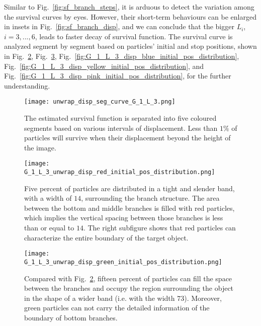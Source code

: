       Similar to Fig.~\ref{fig:sf_branch_steps}, it is arduous to
      detect the variation among the survival curves by eyes. However,
      their short-term behaviours can be enlarged in insets in
      Fig.~\ref{fig:sf_branch_disp}, and we can conclude that the
      bigger $L_i$, $i=3, ..., 6$, leads to faster decay of survival
      function. The survival curve is analyzed segment by segment
      based on particles' initial and stop positions, shown in
      Fig.~\ref{fig:G_1_L_3_disp_red_initial_pos_distribution},
      Fig.~\ref{fig:G_1_L_3_disp_green_initial_pos_distribution},
      Fig.~\ref{fig:G_1_L_3_disp_blue_initial_pos_distribution},
      Fig.~\ref{fig:G_1_L_3_disp_yellow_initial_pos_distribution}, and
      Fig.~\ref{fig:G_1_L_3_disp_pink_initial_pos_distribution}, for
      the further understanding.
      


      \begin{figure}
         \centering
         \texttt{[image: unwrap\_disp\_seg\_curve\_G\_1\_L\_3.png]}
         \caption{The estimated survival function is separated into
           five coloured segments based on various intervals of
           displacement. Less than $1\%$ of particles will survive
           when their displacement beyond the height of the image.}
         \label{fig:disp_seg_curve_G_1_L_3}
      \end{figure}

      
       \begin{figure}
         \centering
         \texttt{[image: G\_1\_L\_3\_unwrap\_disp\_red\_initial\_pos\_distribution.png]}
         \caption{Five percent of particles are distributed in a tight
           and slender band, with a width of $14$, surrounding the
           branch structure. The area between the bottom and middle
           branches is filled with red particles, which implies the
           vertical spacing between those branches is less than or
           equal to $14$. The right subfigure shows that red particles
           can characterize the entire boundary of the target object.}
         \label{fig:G_1_L_3_disp_red_initial_pos_distribution}
       \end{figure}


       \begin{figure}
         \centering
         \texttt{[image: G\_1\_L\_3\_unwrap\_disp\_green\_initial\_pos\_distribution.png]}
         \caption{Compared with
           Fig.~\ref{fig:G_1_L_3_disp_red_initial_pos_distribution},
           fifteen percent of particles can fill the space between the
           branches and occupy the region surrounding the object in
           the shape of a wider band (i.e. with the width
           $73$). Moreover, green particles can not carry the detailed
           information of the boundary of bottom branches.}
         \label{fig:G_1_L_3_disp_green_initial_pos_distribution}
       \end{figure}



